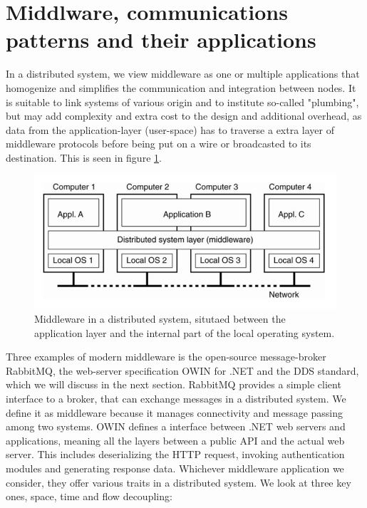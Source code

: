 \section{Middlware, communications patterns and their applications}

In a distributed system, we view middleware as one or multiple applications that homogenize and simplifies the communication and integration between nodes. It is suitable to link systems of various origin and to institute so-called "plumbing", but may add complexity and extra cost to the design and additional overhead, as data from the application-layer (user-space) has to traverse a extra layer of middleware protocols before being put on a wire or broadcasted to its destination. This is seen in figure \ref{fig:middleware}. 

\begin{figure}[h!]\label{}
	\centering
	\includegraphics[scale=0.5]{middleware/middlewaredist.png}
	\caption{Middleware in a distributed system, situtaed between the application layer and the internal part of the local operating system.}
	\label{fig:middleware}
\end{figure}

\noindent Three examples of modern middleware is the open-source message-broker RabbitMQ, the web-server specification OWIN for .NET and the DDS standard, which we will discuss in the next section. RabbitMQ provides a simple client interface to a broker, that can exchange messages in a distributed system. We define it as middleware because it manages connectivity and message passing among two systems. OWIN defines a interface between .NET web servers and applications, meaning all the layers between a public API and the actual web server. This includes deserializing the HTTP request,   invoking authentication modules and generating response data. Whichever middleware application we consider, they offer various traits in a distributed system. We look at three key ones, space, time and flow decoupling:

